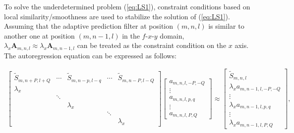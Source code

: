 To solve the underdetermined problem (\ref{eq:LS1}), constraint
conditions based on local similarity/smoothness are used to stabilize
the solution of (\ref{eq:LS1}).  Assuming that the adaptive prediction
filter at position $(m,n,l)$ is similar to another one at position
$(m,n-1,l)$ in the $f$-$x$-$y$ domain, $ \lambda_{x}
\mathbf{A}_{m,n,l} \approx \lambda_{x} \mathbf{A}_{m,n-1,l} $ can be
treated as the constraint condition on the $x$ axis.  The
autoregression equation can be expressed as follows:
\begin{small}
    \begin{equation}
        \label{eq:matrixpointnorm}
        \begin{aligned}
            \begin{bmatrix}
                \tilde{S}_{m,n+P,l+Q} & \cdots                & \tilde{S}_{m,n-p,l-q} &
                \cdots                & \tilde{S}_{m,n-P,l-Q}                                                \\
                \lambda_{x}           &                       &                       &        &             \\
                                      & \ddots                &                       &        &             \\
                                      &                       & \lambda_{x}           &        &             \\
                                      &                       &                       & \ddots &             \\
                                      &                       &                       &        & \lambda_{x}
            \end{bmatrix}
            \begin{bmatrix}
                a_{m,n,l,-P,-Q} \\
                \vdots          \\
                a_{m,n,l,p,q}   \\
                \vdots          \\
                a_{m,n,l,P,Q}
            \end{bmatrix}
            \approx
            \begin{bmatrix}
                \tilde{S}_{m,n,l}             \\
                \lambda_{x} a_{m,n-1,l,-P,-Q} \\
                \vdots                        \\
                \lambda_{x} a_{m,n-1,l,p,q}   \\
                \vdots                        \\
                \lambda_{x} a_{m,n-1,l,P,Q}
            \end{bmatrix},
        \end{aligned}
    \end{equation}
\end{small}
